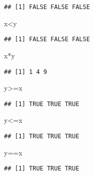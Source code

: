 \documentclass[
]{book}
\newenvironment{Shaded}{\begin{snugshade}}{\end{snugshade}}
\newcommand{\NormalTok}[1]{#1}
\newcommand{\SpecialCharTok}[1]{\textcolor[rgb]{0.00,0.00,0.00}{#1}}
\begin{document}
\begin{verbatim}
## [1] FALSE FALSE FALSE
\end{verbatim}

\begin{Shaded}
\begin{Highlighting}[]
\NormalTok{x}\SpecialCharTok{\textless{}}\NormalTok{y}
\end{Highlighting}
\end{Shaded}

\begin{verbatim}
## [1] FALSE FALSE FALSE
\end{verbatim}

\begin{Shaded}
\begin{Highlighting}[]
\NormalTok{x}\SpecialCharTok{*}\NormalTok{y}
\end{Highlighting}
\end{Shaded}

\begin{verbatim}
## [1] 1 4 9
\end{verbatim}

\begin{Shaded}
\begin{Highlighting}[]
\NormalTok{y}\SpecialCharTok{\textgreater{}=}\NormalTok{x}
\end{Highlighting}
\end{Shaded}

\begin{verbatim}
## [1] TRUE TRUE TRUE
\end{verbatim}

\begin{Shaded}
\begin{Highlighting}[]
\NormalTok{y}\SpecialCharTok{\textless{}=}\NormalTok{x}
\end{Highlighting}
\end{Shaded}

\begin{verbatim}
## [1] TRUE TRUE TRUE
\end{verbatim}

\begin{Shaded}
\begin{Highlighting}[]
\NormalTok{y}\SpecialCharTok{==}\NormalTok{x}
\end{Highlighting}
\end{Shaded}

\begin{verbatim}
## [1] TRUE TRUE TRUE
\end{verbatim}
\end{document}

